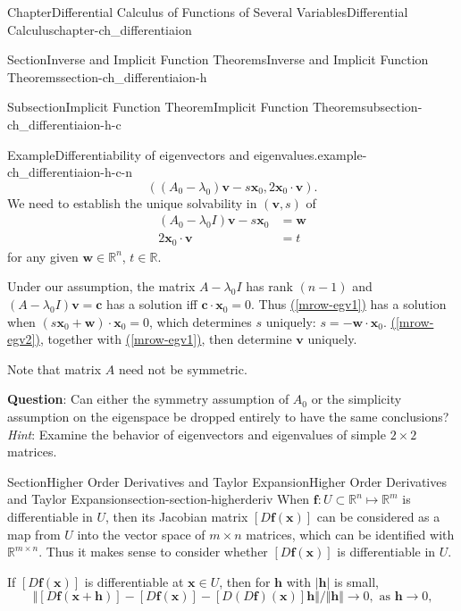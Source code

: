 \documentclass[oneside,10pt,]{book}
\newcommand{\xreffont}{\relax}
\newcommand{\terminology}[1]{\textbf{#1}}
\numberwithin{equation}{section}
\newcommand{\bc}{\mathbf{c}}
\newcommand{\bff}{\mathbf{f}}
\newcommand{\bh}{\mathbf{h}}
\newcommand{\bv}{\mathbf{v}}
\newcommand{\bw}{\mathbf{w}}
\newcommand{\bx}{\mathbf{x}}
\newcommand{\bbR}{\mathbb{R}}
\newcommand{\amp}{&}
\begin{document}
\begin{chapterptx}{Chapter}{Differential Calculus of Functions of Several Variables}{}{Differential Calculus}{}{}{chapter-ch_differentiaion}
\begin{sectionptx}{Section}{Inverse and Implicit Function Theorems}{}{Inverse and Implicit Function Theorems}{}{}{section-ch_differentiaion-h}
\begin{subsectionptx}{Subsection}{Implicit Function Theorem}{}{Implicit Function Theorem}{}{}{subsection-ch_differentiaion-h-c}
\begin{example}{Example}{Differentiability of eigenvectors and eigenvalues.}{example-ch_differentiaion-h-c-n}
\begin{equation*}
((A_{0}-\lambda_{0})\bv -s \bx_{0}, 2 \bx_{0}\cdot \bv).
\end{equation*}
We need to establish the unique solvability in \((\bv, s)\) of%
\begin{align}
(A_{0}-\lambda_{0}I)\bv -s \bx_{0} \amp = \bw \label{mrow-egv1}\\
2 \bx_{0}\cdot \bv \amp = t\label{mrow-egv2}
\end{align}
for any given \(\bw \in \bbR^{n}\), \(t\in \bbR\).%
\par
Under our assumption, the matrix \(A-\lambda_{0}I\) has rank \((n-1)\) and \((A-\lambda_{0}I)\bv=\bc\) has a solution iff \(\bc\cdot \bx_{0}=0\). Thus \hyperref[mrow-egv1]{({\xreffont\ref{mrow-egv1}})} has a solution when \((s\bx_{0}+\bw)\cdot \bx_{0}=0\), which determines \(s\) uniquely: \(s=- \bw\cdot \bx_{0}\). \hyperref[mrow-egv2]{({\xreffont\ref{mrow-egv2}})}, together with \hyperref[mrow-egv1]{({\xreffont\ref{mrow-egv1}})}, then determine \(\bv\) uniquely.%
\par
Note that matrix \(A\) need not be symmetric.%
\par
\terminology{Question}: Can either the symmetry assumption of \(A_{0}\) or the simplicity assumption on the eigenspace be dropped entirely to have the same conclusions?%
 \emph{Hint}: Examine the behavior of eigenvectors and eigenvalues of simple \(2\times 2\) matrices.%
\end{example}
\end{subsectionptx}
\end{sectionptx}
%
%
\typeout{************************************************}
\typeout{************************************************}
%
\begin{sectionptx}{Section}{Higher Order Derivatives and Taylor Expansion}{}{Higher Order Derivatives and Taylor Expansion}{}{}{section-section-higherderiv}
When \(\bff :U\subset \bbR^{n}\mapsto \bbR^{m}\) is differentiable in \(U\), then its Jacobian matrix \([D\bff (\bx)]\) can be considered as a map from \(U\) into the vector space of \(m\times n\) matrices, which can be identified with \(\bbR^{m\times n}\). Thus it makes sense to consider whether \([D\bff (\bx)]\) is differentiable in \(U\).%
\par
If \([D\bff (\bx)]\) is differentiable at \(\bx \in U\), then for \(\bh\)  with \(|\bh|\) is small,%
\begin{equation*}
\Vert [D\bff (\bx+\bh)]-[D\bff (\bx)] - [D\left(D\bff\right) (\bx)]\bh\Vert /\Vert \bh \Vert \to 0, \text{ as $\bh\to 0$,}

\end{equation*}
\end{sectionptx}
\end{chapterptx}
\end{document}
